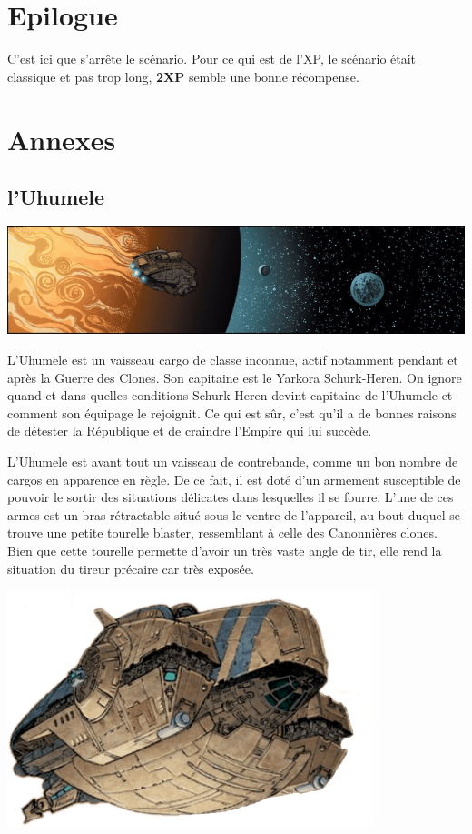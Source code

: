 \documentclass{jdrp}
\begin{document}
	\section{Epilogue}
	C’est ici que s’arrête le scénario. Pour ce qui est de l’XP, le scénario était classique et pas trop long, \textbf{2XP} semble une bonne récompense.


	\newpage
	\section{Annexes}
	\subsection{l’Uhumele}\label{sec:uhumele}
	\noindent\includegraphics[width=\textwidth]{_img/uhumele-pano.png}

	L’Uhumele est un vaisseau cargo de classe inconnue, actif notamment pendant et après la Guerre des Clones. Son capitaine est le Yarkora Schurk-Heren. On ignore quand et dans quelles conditions Schurk-Heren devint capitaine de l’Uhumele et comment son équipage le rejoignit. Ce qui est sûr, c’est qu’il a de bonnes raisons de détester la République et de craindre l’Empire qui lui succède.

	L’Uhumele est avant tout un vaisseau de contrebande, comme un bon nombre de cargos en apparence en règle. De ce fait, il est doté d’un armement susceptible de pouvoir le sortir des situations délicates dans lesquelles il se fourre. L’une de ces armes est un bras rétractable situé sous le ventre de l’appareil, au bout duquel se trouve une petite tourelle blaster, ressemblant à celle des Canonnières clones. Bien que cette tourelle permette d’avoir un très vaste angle de tir, elle rend la situation du tireur précaire car très exposée. 

	\hspace{12em}
	\includegraphics[width=0.8\textwidth]{_img/uhumele.png}
	

	\onecolumn
	\nocite{*}
	\printbibliography
\end{document}
